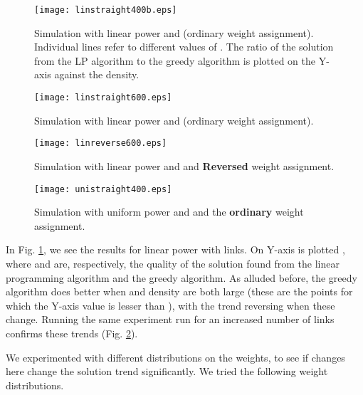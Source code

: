 \documentclass[11pt]{amsart}
\begin{document}
\begin{figure}
\begin{center}
\texttt{[image: linstraight400b.eps]}
\caption{Simulation with linear power and  (ordinary weight assignment). Individual lines refer to different values of . The ratio of the solution from the LP algorithm to the greedy algorithm is plotted on the Y-axis against the density.} 
\label{fig:linstraight400}
\end{center}
\end{figure}

\begin{figure}
\begin{center}
\texttt{[image: linstraight600.eps]}
\caption{Simulation with linear power and  (ordinary weight assignment). } 
\label{fig:linstraight600}
\end{center}
\end{figure}

\begin{figure}
\begin{center}
\texttt{[image: linreverse600.eps]}
\caption{Simulation with linear power and  and {\bf Reversed} weight assignment. } 
\label{fig:linreverse600}
\end{center}
\end{figure}

\begin{figure}
\begin{center}
\texttt{[image: unistraight400.eps]}
\caption{Simulation with uniform power and  and the {\bf ordinary} weight assignment. } 
\label{fig:unistraight400}
\end{center}
\end{figure}


In Fig. \ref{fig:linstraight400}, we see the results for linear power with  links. On Y-axis is plotted , where
 and  are, respectively, the quality of the solution found from the linear programming algorithm and the greedy algorithm.
As alluded before, the greedy algorithm does better when  and density are both large (these are the points for which the Y-axis value is lesser than ), with the trend reversing when these change. 
Running the same experiment run for an increased number of links  confirms these trends (Fig. \ref{fig:linstraight600}).

We experimented with different distributions on the weights, to see if changes here change the solution trend significantly. We tried the following weight distributions.
\end{document}

